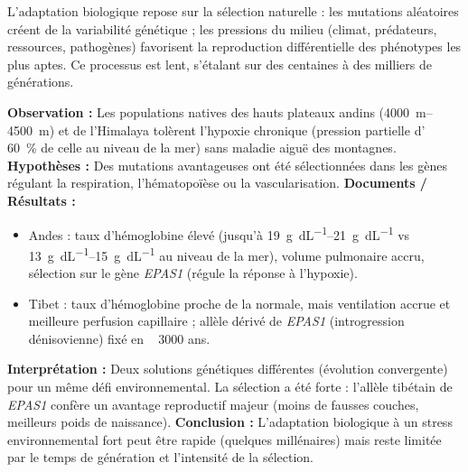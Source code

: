 \documentclass[11pt]{article}
\newcommand{\cle}[1]{{\popxbold\color{popdark}#1}}
\begin{document}
L'adaptation biologique repose sur la \cle{sélection naturelle} : les mutations aléatoires créent de la variabilité génétique ; les pressions du milieu (climat, prédateurs, ressources, pathogènes) favorisent la reproduction différentielle des phénotypes les plus aptes. Ce processus est lent, s'étalant sur des centaines à des milliers de générations.

\begin{experience}
\textbf{Observation :} Les populations natives des hauts plateaux andins (\SIrange{4000}{4500}{\meter}) et de l'Himalaya tolèrent l'hypoxie chronique (pression partielle d' ~ \SI{60}{\%} de celle au niveau de la mer) sans maladie aiguë des montagnes.
\textbf{Hypothèses :} Des mutations avantageuses ont été sélectionnées dans les gènes régulant la respiration, l'hématopoïèse ou la vascularisation.
\textbf{Documents / Résultats :} 
\begin{itemize}
    \item Andes : taux d'hémoglobine élevé (jusqu'à \SIrange{19}{21}{\gram\per\deci\liter} vs \SIrange{13}{15}{\gram\per\deci\liter} au niveau de la mer), volume pulmonaire accru, sélection sur le gène \emph{EPAS1} (régule la réponse à l'hypoxie).
    \item Tibet : taux d'hémoglobine proche de la normale, mais ventilation accrue et meilleure perfusion capillaire ; allèle dérivé de \emph{EPAS1} (introgression dénisovienne) fixé en ~ \num{3000} ans.
\end{itemize}
\textbf{Interprétation :} Deux solutions génétiques différentes (\cle{évolution convergente}) pour un même défi environnemental. La sélection a été forte : l'allèle tibétain de \emph{EPAS1} confère un avantage reproductif majeur (moins de fausses couches, meilleurs poids de naissance).
\textbf{Conclusion :} L'adaptation biologique à un stress environnemental fort peut être rapide (quelques millénaires) mais reste limitée par le temps de génération et l'intensité de la sélection.
\end{experience}
\end{document}
